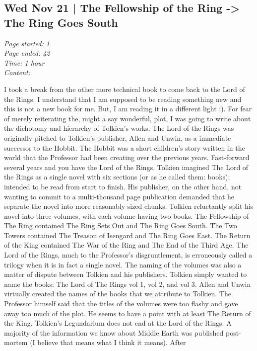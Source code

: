 \documentclass{article}
\begin{document}
\subsection{Wed Nov 21 | The Fellowship of the Ring -> The Ring Goes South}
\textit{Page started: 1 \\
        Page ended: 42 \\
        Time: 1 hour \\
        Content: \\
}

I took a break from the other more technical book to come back to the Lord of
the Rings. I understand that I am supposed to be reading something new and this
is not a new book for me. But, I am reading it in a different light :). For
fear of merely reiterating the, might a say wonderful, plot, I was going to
write about the dichotomy and hierarchy of Tolkien's works. The Lord of the
Rings was originally pitched to Tolkien's publisher, Allen and Unwin, as a
immediate successor to the Hobbit. The Hobbit was a short children's story
written in the world that the Professor had been creating over the previous
years. Fast-forward several years and you have the Lord of the Rings. Tolkien
imagined The Lord of the Rings as a single novel with six sections (or as he
called them: books); intended to be read from start to finish. His publisher,
on the other hand, not wanting to commit to a multi-thousand page publication
demanded that he separate the novel into more reasonably sized chunks. Tolkien
reluctantly split his novel into three volumes, with each volume having two
books. The Fellowship of The Ring contained The Ring Sets Out and The Ring Goes
South. The Two Towers contained The Treason of Isengard and The Ring Goes East.
The Return of the King contained The War of the Ring and The End of the Third
Age. The Lord of the Rings, much to the Professor's disgruntlement, is
erroneously called a trilogy when it is in fact a single novel. The naming of
the volumes was also a matter of dispute between Tolkien and his publishers.
Tolkien simply wanted to name the books: The Lord of The Rings vol 1, vol 2,
and vol 3. Allen and Unwin virtually created the names of the books that we
attribute to Tolkien. The Professor himself said that the titles of the volumes
were too flashy and gave away too much of the plot. He seems to have a point
with at least The Return of the King. Tolkien's Legundarium does not end at
the Lord of the Rings. A majority of the information we know about Middle Earth
was published post-mortem (I believe that means what I think it means). After
\end{document}
